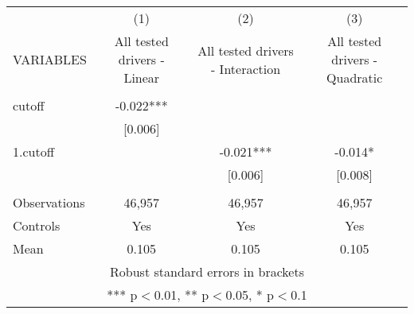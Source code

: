 \documentclass[]{article}
\begin{document}
\begin{tabular}{lccc} \hline
 & (1) & (2) & (3) \\
VARIABLES & All tested drivers - Linear & All tested drivers - Interaction & All tested drivers - Quadratic \\ \hline
 &  &  &  \\
cutoff & -0.022*** &  &  \\
 & [0.006] &  &  \\
1.cutoff &  & -0.021*** & -0.014* \\
 &  & [0.006] & [0.008] \\
 &  &  &  \\
Observations & 46,957 & 46,957 & 46,957 \\
Controls & Yes & Yes & Yes \\
 Mean & 0.105 & 0.105 & 0.105 \\ \hline
\multicolumn{4}{c}{ Robust standard errors in brackets} \\
\multicolumn{4}{c}{ *** p$<$0.01, ** p$<$0.05, * p$<$0.1} \\
\end{tabular}
\end{document}
